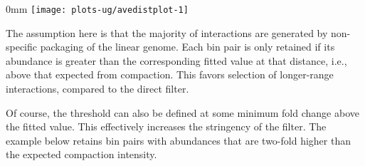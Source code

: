 \documentclass{report}\usepackage[]{graphicx}\usepackage[usenames,dvipsnames]{color}
\makeatletter
\def\maxwidth{ %
  \ifdim\Gin@nat@width>\linewidth
    \linewidth
  \else
    \Gin@nat@width
  \fi
}
\newcommand{\hlnum}[1]{\textcolor[rgb]{0.816,0.125,0.439}{#1}}%
\newcommand{\hlstr}[1]{\textcolor[rgb]{0.251,0.627,0.251}{#1}}%
\newcommand{\hlopt}[1]{\textcolor[rgb]{0,0,0}{#1}}%
\newcommand{\hlstd}[1]{\textcolor[rgb]{0.251,0.251,0.251}{#1}}%
\newcommand{\hlkwb}[1]{\textcolor[rgb]{0,0,0}{#1}}%
\newcommand{\hlkwc}[1]{\textcolor[rgb]{0.251,0.251,0.251}{#1}}%
\newcommand{\hlkwd}[1]{\textcolor[rgb]{0.878,0.439,0.125}{#1}}%
\newenvironment{knitrout}{}{} %
\makeatother
\begin{document}
\begin{knitrout}
\color{fgcolor}\begin{adjustwidth}{\fltoffset}{0mm}
\texttt{[image: plots-ug/avedistplot-1]} \end{adjustwidth}
\end{knitrout}

The assumption here is that the majority of interactions are generated by non-specific packaging of the linear genome.
Each bin pair is only retained if its abundance is greater than the corresponding fitted value at that distance, i.e., above that expected from compaction. 
This favors selection of longer-range interactions, compared to the direct filter.

\begin{knitrout}
\color{fgcolor}
\end{knitrout}

Of course, the threshold can also be defined at some minimum fold change above the fitted value.
This effectively increases the stringency of the filter.
The example below retains bin pairs with abundances that are two-fold higher than the expected compaction intensity.

\begin{knitrout}
\color{fgcolor}
\end{knitrout}
\end{document}
